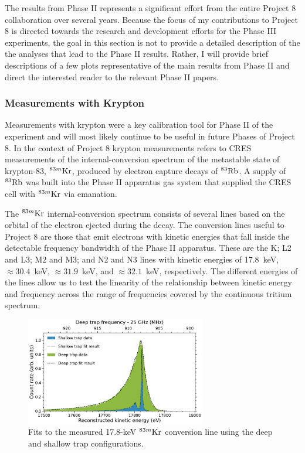 The results from Phase II represents a significant effort from the entire Project 8 collaboration over several years. Because the focus of my contributions to Project 8 is directed towards the research and development efforts for the Phase III experiments, the goal in this section is not to provide a detailed description of the the analyses that lead to the Phase II results. Rather, I will provide brief descriptions of a few plots representative of the main results from Phase II and direct the interested reader to the relevant Phase II papers.  

\subsubsection*{Measurements with Krypton}

Measurements with krypton were a key calibration tool for Phase II of the experiment and will most likely continue to be useful in future Phases of Project 8. In the context of Project 8 krypton measurements refers to CRES measurements of the internal-conversion spectrum of the metastable state of krypton-83, $^{83m}\rm{Kr}$, produced by electron capture decays of $^{83}\rm{Rb}$. A supply of $^{83}\rm{Rb}$ was built into the Phase II apparatus gas system that supplied the CRES cell with $^{83m}\rm{Kr}$ via emanation.

The $^{83m}\rm{Kr}$ internal-conversion spectrum consists of several lines based on the orbital of the electron ejected during the decay. The conversion lines useful to Project 8 are those that emit electrons with kinetic energies that fall inside the detectable frequency bandwidth of the Phase II apparatus. These are the K; L2 and L3; M2 and M3; and N2 and N3 lines with kinetic energies of 17.8~keV, $\approx 30.4$~keV, $\approx 31.9$~keV, and $\approx 32.1$~keV, respectively. The different energies of the lines allow us to test the linearity of the relationship between kinetic energy and frequency across the range of frequencies covered by the continuous tritium spectrum.

\begin{figure}[htbp]
    \centering
    \includegraphics[width=0.7\textwidth]{figs/Chapter-3/kr_fit.pdf}
    \caption{Fits to the measured 17.8-keV $^{83m}\rm{Kr}$ conversion line using the deep and shallow trap configurations. }
    \label{fig:chap3-krypton-spec-fit}
\end{figure}

